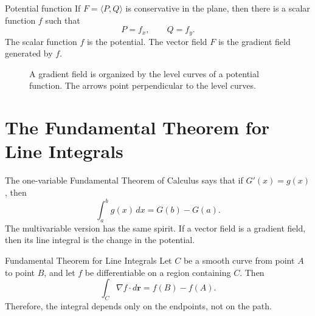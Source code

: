 \documentclass[11pt,oneside]{book}
\newcommand{\vect}[1]{\mathbf{#1}}
\newcommand{\grad}{\nabla}
\begin{document}
\begin{definitionbox}{Potential function}
If $F=\langle P,Q\rangle$ is conservative in the plane, then there is a scalar function $f$ such that
\[
P=f_x,\qquad Q=f_y.
\]
The scalar function $f$ is the potential. The vector field $F$ is the gradient field generated by $f$.
\end{definitionbox}

\begin{figure}[H]
\centering
{}
\caption{A gradient field is organized by the level curves of a potential function. The arrows point perpendicular to the level curves.}
\end{figure}

\section{The Fundamental Theorem for Line Integrals}

The one-variable Fundamental Theorem of Calculus says that if $G'(x)=g(x)$, then
\[
\int_a^b g(x)\,dx=G(b)-G(a).
\]
The multivariable version has the same spirit. If a vector field is a gradient field, then its line integral is the change in the potential.

\begin{theorembox}{Fundamental Theorem for Line Integrals}
Let $C$ be a smooth curve from point $A$ to point $B$, and let $f$ be differentiable on a region containing $C$. Then
\[
\int_C \grad f\cdot d\vect r=f(B)-f(A).
\]
Therefore, the integral depends only on the endpoints, not on the path.
\end{theorembox}
\end{document}
